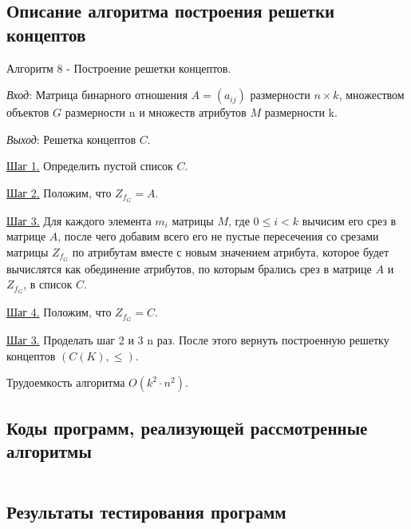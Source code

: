 \documentclass[spec, och, labwork]{shiza}
\begin{document}
\subsection{Описание алгоритма построения решетки концептов}

Алгоритм 8 - Построение решетки концептов.

\textit{Вход}: Матрица бинарного отношения $A = (a_{ij})$ размерности $n \times k$, множеством объектов $G$ размерности n 
и множеств атрибутов $M$ размерности k.

\textit{Выход}: Решетка концептов $C$.

\underline{Шаг 1.} Определить пустой список $C$.

\underline{Шаг 2.} Положим, что $Z_{f_G} = A$.

\underline{Шаг 3.} Для каждого элемента $m_i$ матрицы $M$, где $0 \leq i < k$ вычисим его срез в матрице $A$, после чего добавим всего
его не пустые пересечения со срезами матрицы $Z_{f_G}$ по атрибутам вместе с новым значением атрибута, которое будет вычислятся
как обединение атрибутов, по которым брались срез в матрице $A$ и $Z_{f_G}$, в список $C$.

\underline{Шаг 4.} Положим, что $Z_{f_G} = C$. 

\underline{Шаг 3.} Проделать шаг 2  и 3 n раз. После этого вернуть построенную решетку концептов $(C(K), \leq)$. 

Трудоемкость алгоритма $O(k^2 \cdot n^2)$.
    
        \subsection{Коды программ, реализующей рассмотренные алгоритмы}

            \inputminted[fontsize=\small]{python}{../code/lab2.py}
    
        \subsection{Результаты тестирования программ}
\end{document}
